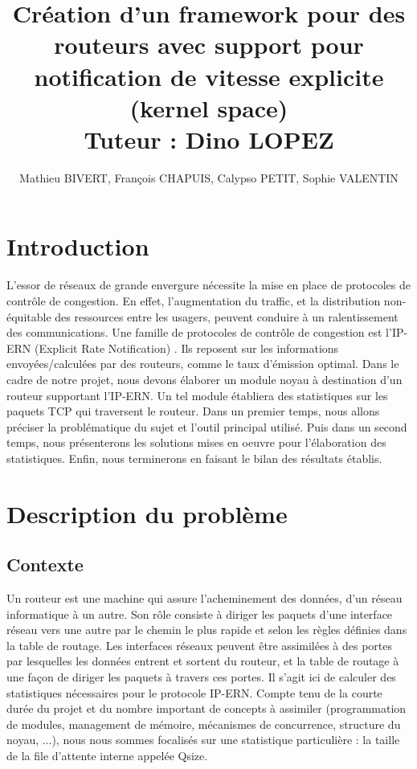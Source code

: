 \documentclass[a4paper]{article}
\title{Création d'un framework pour des routeurs
	avec support pour notification de vitesse explicite
	(kernel space)\\Tuteur : Dino LOPEZ}
\author{Mathieu BIVERT, François CHAPUIS, Calypso PETIT, Sophie VALENTIN}
\begin{document}
\maketitle

\newpage
\tableofcontents

\newpage
\section{Introduction}

L'essor de réseaux de grande envergure nécessite la mise en
place de protocoles de contrôle de congestion. En effet,
l'augmentation du traffic, et la distribution non-équitable
des ressources entre les usagers, peuvent conduire à un
ralentissement des communications.
Une famille de protocoles de contrôle de congestion est l'IP-ERN
(Explicit Rate Notification) \cite{thesis1}. Ils reposent sur les informations
envoyées/calculées par des routeurs, comme le taux d'émission
optimal. Dans le cadre de notre projet, nous devons élaborer un
module noyau à destination d'un routeur supportant l'IP-ERN.
Un tel module établiera des statistiques sur les paquets TCP 
qui traversent le routeur. Dans un premier temps, nous allons préciser
la problématique du sujet et l'outil principal utilisé. Puis dans un
second temps, nous présenterons les solutions mises en oeuvre pour 
l'élaboration des statistiques. Enfin, nous terminerons en faisant le
bilan des résultats établis.

\section{Description du problème}
\subsection{Contexte}
Un routeur est une machine qui assure l’acheminement des données,
d'un réseau informatique à un autre. Son rôle consiste à diriger
les paquets d'une interface réseau vers une autre par le chemin
le plus rapide et selon les règles définies dans la table de
routage. 
Les interfaces réseaux peuvent être assimilées à des
portes par lesquelles les données entrent et sortent du routeur, et
la table de routage à une façon de diriger les paquets à travers
ces portes. 
Il s'agit ici de calculer des statistiques nécessaires 
pour le protocole IP-ERN. Compte tenu de la courte durée du projet et 
du nombre important de concepts à assimiler (programmation de modules,
management de mémoire, mécanismes de concurrence, structure du noyau, ...),
nous nous sommes focalisés sur une statistique particulière : la taille
de la file d'attente interne appelée Qsize.
\end{document}
